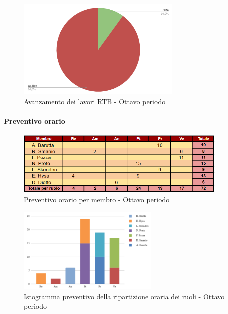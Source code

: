 \begin{figure}[H]
    \centering
    \begin{minipage}[b]{0.70\textwidth}
        \centering
        \includegraphics[width=0.7\textwidth]{../Images/avanzamento8Periodo.png}
        \caption{Avanzamento dei lavori RTB - Ottavo periodo}
        \label{fig:Avanzamento_RTB_8}
    \end{minipage}
\end{figure}

\paragraph{Preventivo orario}

\begin{figure}[H] 
    \centering
    \includegraphics[width=0.9\textwidth]{../Images/preventivoOrario8Periodo.png}
    \caption{Preventivo orario per membro - Ottavo periodo}
    \label{fig:Preventivo_orario_8}
\end{figure}

\begin{figure}[H]
    \centering
    \includegraphics[width=0.6\textwidth]{../Images/preventivoDivisioneRuoli8Periodo.png}
    \caption{Istogramma preventivo della ripartizione oraria dei ruoli - Ottavo periodo}
    \label{fig:Preventivo_ripartizione_oraria_8}
\end{figure}

